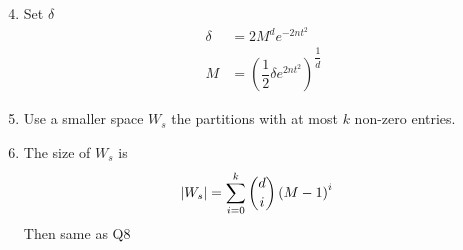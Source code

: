 \documentclass{article}
\begin{document}
\begin{enumerate}
\setcounter{enumii}{3}
\item Set $\delta$
\begin{align*}
\delta &= 2 M^{d} e^{-2 n t^{2}}
\\ M  &= \left(\dfrac{1}{2} \delta e^{2 n t^{2}}\right)^{\dfrac{1}{d}}
\end{align*}
\item Use a smaller space $W_{s}$ the partitions with at most $k $ non-zero entries.
\end{enumerate}

\begin{enumerate}
\setcounter{enumii}{5}
\item The size of $W_{s}$ is
\begin{align*}
| W_{s} | &= \displaystyle\sum_{i=0}^{k} \dbinom{d}{i} \left(M - 1\right)^{i}
\end{align*}
Then same as Q8


\newpage

\end{enumerate}
\end{document}
